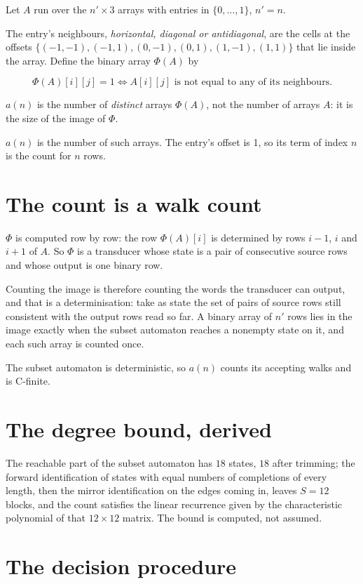 \documentclass[11pt]{article}
\theoremstyle{definition}
\begin{document}
Let $A$ run over the $n' \times 3$ arrays with entries in $\{0,\dots,1\}$, $n' = n$.

The entry's neighbours, {\itshape horizontal, diagonal or antidiagonal}, are the cells at the offsets $\{(-1,-1), (-1,1), (0,-1), (0,1), (1,-1), (1,1)\}$ that lie inside the array. Define the binary array $\Phi(A)$ by

\[\Phi(A)[i][j] = 1 \iff A[i][j] \text{ is not equal to any of its neighbours}.\]

$a(n)$ is the number of {\itshape distinct} arrays $\Phi(A)$, not the number of arrays $A$: it is the size of the image of $\Phi$.

$a(n)$ is the number of such arrays. The entry's offset is 1, so its term of index $n$ is the count for $n$ rows.

\section{The count is a walk count}

$\Phi$ is computed row by row: the row $\Phi(A)[i]$ is determined by rows $i-1$, $i$ and $i+1$ of $A$. So $\Phi$ is a transducer whose state is a pair of consecutive source rows and whose output is one binary row.

Counting the image is therefore counting the words the transducer can output, and that is a determinisation: take as state the set of pairs of source rows still consistent with the output rows read so far. A binary array of $n'$ rows lies in the image exactly when the subset automaton reaches a nonempty state on it, and each such array is counted once.

The subset automaton is deterministic, so $a(n)$ counts its accepting walks and is C-finite.

\section{The degree bound, derived}

The reachable part of the subset automaton has $18$ states, $18$ after trimming; the forward identification of states with equal numbers of completions of every length, then the mirror identification on the edges coming in, leaves $S = 12$ blocks, and the count satisfies the linear recurrence given by the characteristic polynomial of that $12\times12$ matrix. The bound is computed, not assumed.

\section{The decision procedure}
\end{document}
